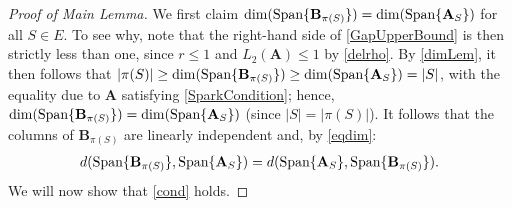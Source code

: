 \documentclass[9pt,twocolumn]{pnas-new}
\begin{document}
\begin{proof}[Proof of Main Lemma]
We first claim $\dim(\text{\rm Span}\{\mathbf{B}_{\pi(S)}\}) = \dim(\text{\rm Span}\{\mathbf{A}_{S}\})$ for all $S \in E$. To see why, note that the right-hand side of \eqref{GapUpperBound} is then strictly less than one, since $r \leq 1$ and $L_2(\mathbf{A}) \leq 1$ by \eqref{delrho}. By \eqref{dimLem}, it then follows that $|\pi(S)| \geq \dim(\text{\rm Span}\{\mathbf{B}_{\pi(S)}\}) \geq \dim(\text{\rm Span}\{\mathbf{A}_{S}\}) = |S|$, with the equality due to $\mathbf{A}$ satisfying \eqref{SparkCondition}; hence, $\dim(\text{\rm Span}\{\mathbf{B}_{\pi(S)}\}) = \dim(\text{\rm Span}\{\mathbf{A}_{S}\})$ (since $|S| = |\pi(S)|$). It follows that the columns of $\mathbf{B}_{\pi(S)}$ are linearly independent and, by \eqref{eqdim}:%
\begin{align}\label{eq2}
d(\text{\rm Span}\{\mathbf{B}_{\pi(S)}\}, \text{\rm Span}\{\mathbf{A}_S\} ) = d(\text{\rm Span}\{\mathbf{A}_S\}, \text{\rm Span}\{\mathbf{B}_{\pi(S)}\}).
\end{align}
We will now show that \eqref{cond} holds.


\end{proof}
\end{document}
